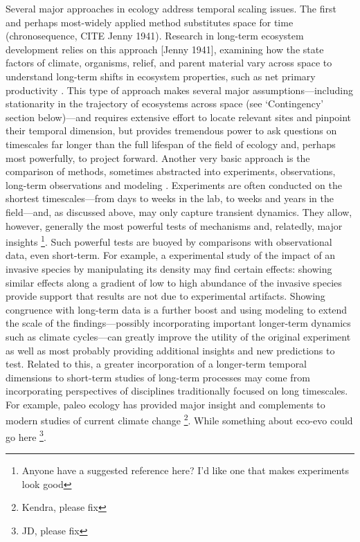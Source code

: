 \documentclass[11pt,a4paper,oneside]{article}
\begin{document}
Several major approaches in ecology address temporal scaling issues. The first and perhaps most-widely applied method substitutes space for time (chronosequence, CITE Jenny 1941). Research in long-term ecosystem development relies on this approach [Jenny 1941], examining how the state factors of climate, organisms, relief, and parent material vary across space to understand long-term shifts in ecosystem properties, such as net primary productivity \citep{Wardle:2004wb}. This type of approach makes several major assumptions---including stationarity in the trajectory of ecosystems across space (see `Contingency' section below)---and requires extensive effort to locate relevant sites and pinpoint their temporal dimension, but provides tremendous power to ask questions on timescales far longer than the full lifespan of the field of ecology and, perhaps most powerfully, to project forward. Another very basic approach is the comparison of methods, sometimes abstracted into experiments, observations, long-term observations and modeling \citep{Carpenter:1992hk}. Experiments are often conducted on the shortest timescales---from days to weeks in the lab, to weeks and years in the field---and, as discussed above, may only capture transient dynamics. They allow, however, generally the most powerful tests of mechanisms and, relatedly, major insights \footnote{Anyone have a suggested reference here? I'd like one that makes experiments look good}. Such powerful tests are buoyed by comparisons with observational data, even short-term. For example, a experimental study of the impact of an invasive species by manipulating its density may find certain effects: showing similar effects along a gradient of low to high abundance of the invasive species provide support that results are not due to experimental artifacts. Showing congruence with long-term data is a further boost and using modeling to extend the scale of the findings---possibly incorporating important longer-term dynamics such as climate cycles---can greatly improve the utility of the original experiment as well as most probably providing additional insights and new predictions to test. Related to this, a greater incorporation of a longer-term temporal dimensions to short-term studies of long-term processes may come from incorporating perspectives of disciplines traditionally focused on long timescales. For example, paleo ecology has provided major insight and complements to modern studies of current climate change \footnote{Kendra, please fix}. While something about eco-evo could go here \footnote{JD, please fix}. \\
\end{document}
